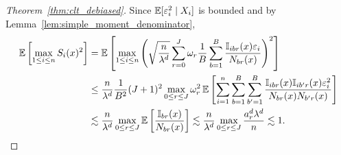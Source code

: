 \begin{proof}[Theorem~\ref{thm:clt_debiased}]
  Since $\mathbb{E}[\varepsilon_i^2 \mid X_i]$ is bounded
  and by Lemma~\ref{lem:simple_moment_denominator},
  \begin{align*}
    \mathbb{E}\left[\max_{1 \leq i \leq n} S_i(x)^2 \right]
    &=
    \mathbb{E}\left[
      \max_{1 \leq i \leq n}
      \left(
        \sqrt{\frac{n}{\lambda^d}}
        \sum_{r=0}^{J}
        \omega_r
        \frac{1}{B} \sum_{b=1}^B
        \frac{\mathbb{I}_{i b r}(x) \varepsilon_i} {N_{b r}(x)}
      \right)^2
    \right] \\
    &\leq
    \frac{n}{\lambda^d}
    \frac{1}{B^2}
    (J+1)^2
    \max_{0 \leq r \leq J}
    \omega_r^2
    \,\mathbb{E}\left[
      \sum_{i=1}^{n}
      \sum_{b=1}^B
      \sum_{b'=1}^B
      \frac{\mathbb{I}_{i b r}(x) \mathbb{I}_{i b' r}(x) \varepsilon_i^2}
      {N_{b r}(x) N_{b' r}(x)}
    \right] \\
    &\lesssim
    \frac{n}{\lambda^d}
    \max_{0 \leq r \leq J}
    \mathbb{E}\left[
      \frac{\mathbb{I}_{b r}(x)}{N_{b r}(x)}
    \right]
    \lesssim
    \frac{n}{\lambda^d}
    \max_{0 \leq r \leq J}
    \frac{a_r^d \lambda^d}{n}
    \lesssim 1.
  \end{align*}



\end{proof}
